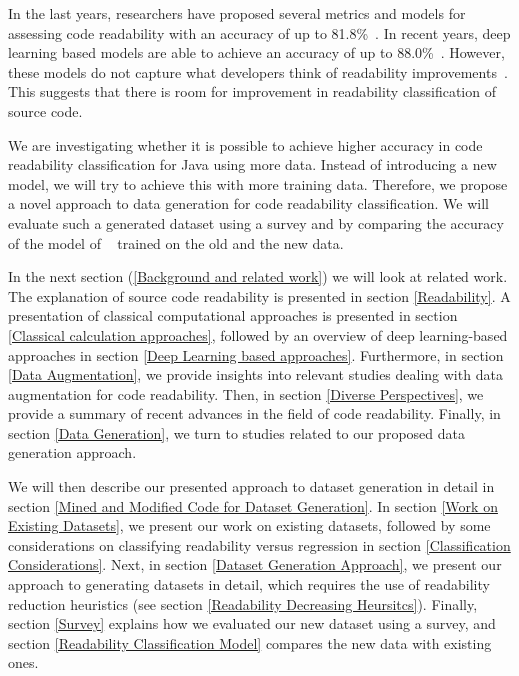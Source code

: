 \documentclass[%
class=scrreprt,
chapterprefix=false,%
open=right,%
twoside=false,%
paper=a4,%
logofile={Logo\_zentral\_farbig\_EN.png},%
thesistype=master,%
UKenglish,%
]{se2thesis}
\theoremstyle{definition}
\newcommand{\citeclassicmodels}{\cite{buse2009learning, posnett2011simpler, dorn2012general, scalabrino2018comprehensive}}
\newcommand{\citedeepmodels}{\cite{mi2018inception, mi2018improving, sharma2020egan, mi2022towards, mi2022rank, mi2023graph}}
\begin{document}
	In the last years, researchers have proposed several metrics and models for assessing code readability with an accuracy of up to 81.8\%~\citeclassicmodels. In recent years, deep learning based models are able to achieve an accuracy of up to 88.0\%~\citedeepmodels.
	However, these models do not capture what developers think of readability improvements~\cite{fakhoury2019improving}. This suggests that there is room for improvement in readability classification of source code. 
	
	We are investigating whether it is possible to achieve higher accuracy in code readability classification for Java using more data. Instead of introducing a new model, we will try to achieve this with more training data. Therefore, we propose a novel approach to data generation for code readability classification. We will evaluate such a generated dataset using a survey and by comparing the accuracy of the model of \citeauthor{mi2022towards}~\cite{mi2022towards} trained on the old and the new data.
	
	In the next section (\ref{Background and related work}) we will look at related work. The explanation of source code readability is presented in section \ref{Readability}. A presentation of classical computational approaches is presented in section \ref{Classical calculation approaches}, followed by an overview of deep learning-based approaches in section \ref{Deep Learning based approaches}. Furthermore, in section \ref{Data Augmentation}, we provide insights into relevant studies dealing with data augmentation for code readability. Then, in section \ref{Diverse Perspectives}, we provide a summary of recent advances in the field of code readability. Finally, in section \ref{Data Generation}, we turn to studies related to our proposed data generation approach.
	
	We will then describe our presented approach to dataset generation in detail in section \ref{Mined and Modified Code for Dataset Generation}. In section \ref{Work on Existing Datasets}, we present our work on existing datasets, followed by some considerations on classifying readability versus regression in section \ref{Classification Considerations}. Next, in section \ref{Dataset Generation Approach}, we present our approach to generating datasets in detail, which requires the use of readability reduction heuristics (see section \ref{Readability Decreasing Heursitcs}). Finally, section \ref{Survey} explains how we evaluated our new dataset using a survey, and section \ref{Readability Classification Model} compares the new data with existing ones.
	
\end{document}
